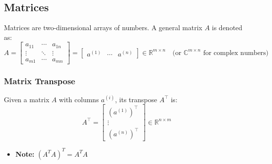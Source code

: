 \subsection{Matrices}
\begin{definition}
    Matrices are two-dimensional arrays of numbers. A general matrix \( A \) is denoted as:
    \begin{equation}
        A = \begin{bmatrix}
            a_{11} & \cdots & a_{1n} \\
            \vdots & \ddots & \vdots \\
            a_{m1} & \cdots & a_{mn}
            \end{bmatrix} 
            = \begin{bmatrix}
                a^{(1)} & \cdots & a^{(n)}
                \end{bmatrix}
            \in \mathbb{R}^{m \times n} \quad \text{(or $\mathbb{C}^{m \times n}$ for complex numbers)}
    \end{equation}
\end{definition}

    \subsubsection{Matrix Transpose}
    \begin{definition}
        Given a matrix \( A \) with columns \( a^{(i)} \), its transpose \( A^\top \) is:
        \begin{equation}
            A^\top = \begin{bmatrix}
                (a^{(1)})^\top \\
                \vdots \\
                (a^{(n)})^\top
                \end{bmatrix} \in \mathbb{R}^{n \times m}
        \end{equation}
        \begin{itemize}
            \item \textbf{Note:} $(A^T A)^T = A^T A$
        \end{itemize}
    \end{definition}

